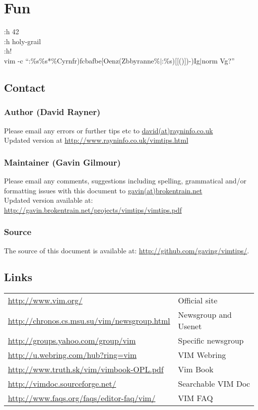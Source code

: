 \documentclass[10pt]{article}
\begin{document}
\section{Fun}
 :h 42\\
 :h holy-grail\\
 :h!\\
 vim -c ``:\%s\%s*\%Cyrnfr)fcbafbe[Oenz(Zbbyranne\%$|$:\%s)[[()])-)Ig$|$norm Vg?''

\subsection{Contact}

\subsubsection{Author (David Rayner)}
Please email any errors or further tips etc to \url{david(at)rayninfo.co.uk}\\
Updated version at \url{http://www.rayninfo.co.uk/vimtips.html}

\subsubsection{Maintainer (Gavin Gilmour)}
Please email any comments, suggestions including spelling, grammatical and/or
formatting issues with this document to \url{gavin(at)brokentrain.net}\\
Updated version available at: \url{http://gavin.brokentrain.net/projects/vimtips/vimtips.pdf}

\subsubsection{Source}
The source of this document is available at:
\url{http://github.com/gaving/vimtips/}.

\subsection{Links}
\begin{longtable}{l|l}
    \url{http://www.vim.org/} & Official site\\
    \url{http://chronos.cs.msu.su/vim/newsgroup.html} & Newsgroup and Usenet\\
    \url{http://groups.yahoo.com/group/vim} & Specific newsgroup\\
    \url{http://u.webring.com/hub?ring=vim} & VIM Webring\\
    \url{http://www.truth.sk/vim/vimbook-OPL.pdf} & Vim Book\\
    \url{http://vimdoc.sourceforge.net/} & Searchable VIM Doc\\
    \url{http://www.faqs.org/faqs/editor-faq/vim/} & VIM FAQ\\
\end{longtable}
\end{document}
